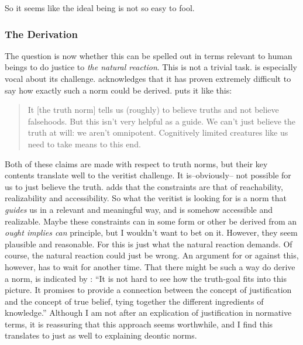 \documentclass[12pt,numbers=noenddot]{scrartcl}
\begin{document}
So it seems like the ideal being is not so easy to fool.

\subsubsection{The Derivation}

The question is now whether this can be spelled out in terms relevant to human beings to do justice to \emph{the natural reaction}. This is not a trivial task. \textcite[Ch. 4]{Gibbons2013-GIBTNO} is especially vocal about its challenge.
\noindent \textcite[Ch. 4]{Boghossian2008-BOGCAJ} acknowledges that it has proven extremely difficult to say how exactly such a norm could be derived. \textcite[16]{Greenberg2016-GREITN} puts it like this:
\begin{quote}
It [the truth norm] tells us (roughly) to believe truths and not believe falsehoods. But this isn’t very helpful as a guide. We can’t just believe the truth at will: we aren’t omnipotent. Cognitively limited creatures like us need to take means to this end.
\end{quote}
Both of these claims are made with respect to truth norms, but their key contents translate well to the veritist challenge. It is–obviously– not possible for us to just believe the truth. \textcite[62]{Goldman2002-GOLTUO-2} adds that the constraints are that of reachability, realizability and accessibility.
So what the veritist is looking for is a norm that \emph{guides} us in a relevant and meaningful way, and is somehow accessible and realizable. Maybe these constraints can in some form or other be derived from an \emph{ought implies can} principle, but I wouldn't want to bet on it. However, they seem plausible and reasonable. For this is just what the natural reaction demands. Of course, the natural reaction could just be wrong. An argument for or against this, however, has to wait for another time. That there might be such a way do derive a norm, is indicated by \textcite[154]{David2001-DAVTAT-7}: “It is not hard to see how the truth‐goal fits into this picture. It promises to provide a connection between the concept of justification and the concept of true belief, tying together the different ingredients of knowledge.” Although I am not after an explication of justification in normative terms, it is reassuring that this approach seems worthwhile, and I find this translates to just as well to explaining deontic norms.
\end{document}
